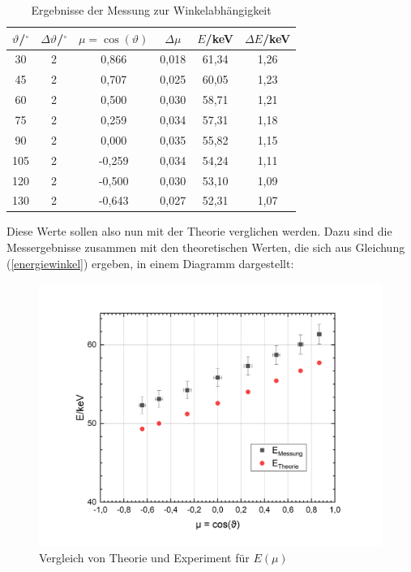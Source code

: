 \documentclass[german,  %
parskip=full,  %
]{scrartcl}
\begin{document}
\newpage
\begin{table}[h!]\centering
\begin{tabular}{|c|c|c|c|c|c|}\hline
$\vartheta$/$^{\circ}$ & $\Delta \vartheta$/$^{\circ}$ & $\mu=\cos(\vartheta)$& $\Delta \mu$ & $E$/keV & $\Delta E$/keV \\\hline
30   & 2 & 0,866 & 0,018 & 61,34 &1,26 		\\\hline
45   & 2 & 0,707 & 0,025 & 60,05 & 1,23		\\\hline
60   & 2 & 0,500 & 0,030 & 58,71 & 1,21		\\\hline
75   & 2 	& 0,259 & 0,034 & 57,31 & 1,18	\\\hline
90   & 2 & 0,000  & 0,035 & 55,82 & 1,15	\\\hline
105 & 2	& -0,259 & 0,034 & 54,24 & 1,11	\\\hline
120 & 2 & -0,500 & 0,030 & 53,10 & 1,09		\\\hline
130 & 2	& -0,643 & 0,027 & 52,31 & 1,07		\\\hline
\end{tabular}
\caption{Ergebnisse der Messung zur Winkelabhängigkeit}
\end{table}
Diese Werte sollen also nun mit der Theorie verglichen werden. Dazu sind die Messergebnisse zusammen mit den theoretischen Werten, die sich aus Gleichung (\ref{energiewinkel}) ergeben, in einem Diagramm dargestellt:
\\
\begin{figure}[h!]\centering
\includegraphics[scale=0.5]{vglexptheorie}
\caption{Vergleich von Theorie und Experiment für $E (\mu)$}
\end{figure}
\end{document}
